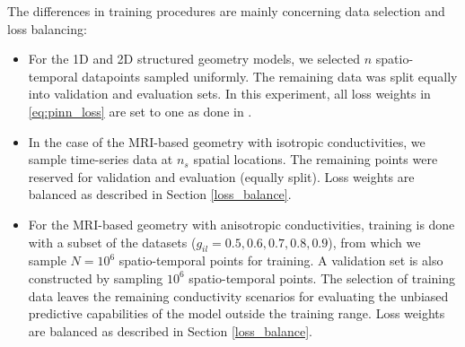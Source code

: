 The differences in training procedures are mainly concerning data selection and loss balancing:
\begin{itemize}
\item For the 1D and 2D structured geometry models, we selected $n$ spatio-temporal datapoints sampled uniformly. The remaining data was split equally into validation and evaluation sets. In this experiment, all loss weights in \eqref{eq:pinn_loss} are set to one as done in \cite{EP-PINNs}.

\item In the case of the MRI-based geometry with isotropic conductivities, we sample time-series data at $n_s$ spatial locations. The remaining points were reserved for validation and evaluation (equally split). Loss weights are balanced as described in Section \ref{loss_balance}.

\item For the MRI-based geometry with anisotropic conductivities, training is done with a subset of the datasets ($g_{il}=0.5,0.6,0.7,0.8,0.9$), from which we sample $N=10^6$ spatio-temporal points for training. A validation set is also constructed by sampling $10^6$ spatio-temporal points. The selection of training data leaves the remaining conductivity scenarios for evaluating the unbiased predictive capabilities of the model outside the training range.  Loss weights are balanced as described in Section \ref{loss_balance}.
\end{itemize}

